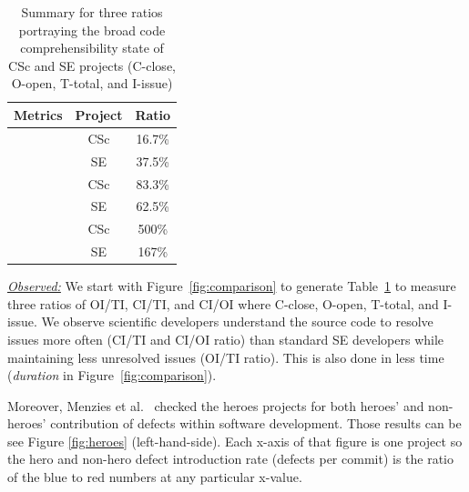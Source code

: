 \documentclass[conference,10pt]{IEEEtran}
\begin{document}
\begin{table}
\vspace{-15pt}
\scriptsize
\centering
\caption{Summary for three ratios portraying the broad code comprehensibility state of CSc and SE projects (C-close, O-open, T-total, and I-issue)}
\vspace{-5pt}
\label{tbl:comprehensibility}
\begin{tabular}{p{7mm}|c|c}
\centering \textbf{Metrics}  & \textbf{Project} & \textbf{Ratio}  \\ \hline
\centering \multirow{2}{*}{OI/TI}  &  CSc & 16.7\%  \\ [2pt]
\centering & SE & 37.5\%  \\ [2pt] \hline
\centering \multirow{2}{*}{CI/OI}  & CSc & 83.3\%  \\ [2pt]
\centering  & SE & 62.5\%  \\ [2pt]
\hline
\centering \multirow{2}{*}{CI/TI} & CSc & 500\%  \\ [2pt]
\centering  & SE & 167\%  \\ [3pt]
\end{tabular}%
\vspace{-15pt}
\end{table}
\noindent \textit{\underline{Observed:}} We start with Figure~\ref{fig:comparison} to generate Table~\ref{tbl:comprehensibility} to measure three ratios of OI/TI, CI/TI, and CI/OI where C-close, O-open, T-total, and I-issue. We observe scientific developers understand the source code to resolve issues more often (CI/TI and CI/OI ratio) than standard SE developers while maintaining less unresolved issues (OI/TI ratio).  This is also done in less time (\textit{duration} in Figure~\ref{fig:comparison}). 



Moreover, Menzies et al.~\cite{majumder19_heroes} checked the heroes projects for both heroes' and non-heroes' contribution of defects within software development. Those
results can be see Figure \ref{fig:heroes} (left-hand-side). Each x-axis of that figure is one project so the hero and non-hero defect introduction rate (defects per commit) is the ratio of the blue to red numbers
at any particular x-value.

\end{document}

